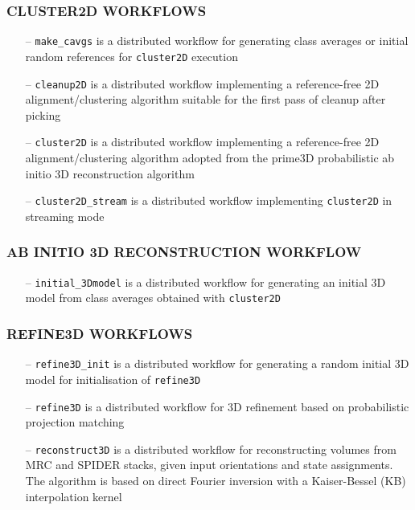 \documentclass[a4paper,11pt]{article}
\newcommand{\prgname}[1]{\textcolor{NavyBlue}{\texttt{#1}}}
\begin{document}
\subsubsection{CLUSTER2D WORKFLOWS}
\begin{itemize}
\item[--] \prgname{make\_cavgs} is a distributed workflow for generating class averages or initial random references for \prgname{cluster2D} execution
\item[--] \prgname{cleanup2D} is a distributed workflow implementing a reference-free 2D alignment/clustering algorithm suitable for the first pass of cleanup after picking
\item[--] \prgname{cluster2D} is a distributed workflow implementing a reference-free 2D alignment/clustering algorithm adopted from the prime3D probabilistic ab initio 3D reconstruction algorithm
\item[--] \prgname{cluster2D\_stream} is a distributed workflow implementing \prgname{cluster2D} in streaming mode
\end{itemize}

\subsubsection{AB INITIO 3D RECONSTRUCTION WORKFLOW}
\begin{itemize}
\item[--] \prgname{initial\_3Dmodel} is a distributed workflow for generating an initial 3D model from class averages obtained with \prgname{cluster2D}
\end{itemize}

\subsubsection{REFINE3D WORKFLOWS}
\begin{itemize}
\item[--] \prgname{refine3D\_init} is a distributed workflow for generating a random initial 3D model for initialisation of \prgname{refine3D}
\item[--] \prgname{refine3D} is a distributed workflow for 3D refinement based on probabilistic projection matching
\item[--] \prgname{reconstruct3D} is a distributed workflow for reconstructing volumes from MRC and SPIDER stacks, given input orientations and state assignments. The algorithm is based on direct Fourier inversion with a Kaiser-Bessel (KB) interpolation kernel
\end{itemize}
\end{document}
